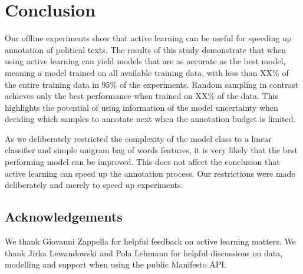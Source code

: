 \documentclass[runningheads,a4paper]{article}
\begin{document}
\section{Conclusion}
Our offline experiments show that active learning can be useful for speeding up annotation of political texts. The results of this study demonstrate that when using active learning can yield models that are as accurate as the best model, meaning a model trained on all available training data, with less than XX\% of the entire training data in 95\% of the experiments. Random sampling in contrast achieves only the best performance when trained on XX\% of the data. This highlights the potential of using information of the model uncertainty when deciding which samples to annotate next when the annotation budget is limited.

As we deliberately restricted the complexity of the model class to a linear classifier and simple unigram bag of words features, it is very likely that the best performing model can be improved. This does not affect the conclusion that active learning can speed up the annotation process. Our restrictions were made deliberately and merely to speed up experiments.

\subsection*{Acknowledgements}
We thank Giovanni Zappella for helpful feedback on active learning matters. We thank Jirka Lewandowski and Pola Lehmann for helpful discussions on data, modelling and support when using the public Manifesto API.
%
\small{

 
}
\end{document}
